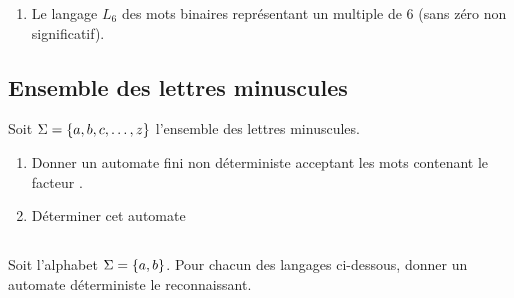 \documentclass[a4paper,french,bookmarks]{book}
\begin{document}
\begin{enumerate}
{\begin{center}
            \end{center}
        }
        
        \item Le langage $L_6$ des mots binaires représentant un multiple de $6$ (sans zéro non significatif).
    \end{enumerate}
    
    \subsection{Ensemble des lettres minuscules}
    
    Soit $\Sigma = \left\{a, b, c, \dots, z\right\}$ l'ensemble des lettres minuscules.
    
    \begin{enumerate}
        \item Donner un automate fini non déterministe acceptant les mots contenant le facteur .
        
        \item Déterminer cet automate
    \end{enumerate}
    
    \subsection{} 
    
    Soit l'alphabet $\Sigma = \left\{a, b\right\}$. Pour chacun des langages ci-dessous, donner un automate déterministe le reconnaissant.
    
\end{document}
